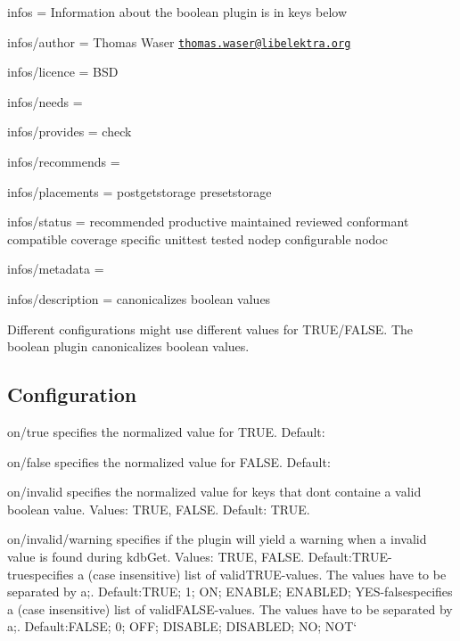 
\begin{DoxyItemize}
\item infos = Information about the boolean plugin is in keys below
\item infos/author = Thomas Waser \href{mailto:thomas.waser@libelektra.org}{\tt thomas.\+waser@libelektra.\+org}
\item infos/licence = B\+SD
\item infos/needs =
\item infos/provides = check
\item infos/recommends =
\item infos/placements = postgetstorage presetstorage
\item infos/status = recommended productive maintained reviewed conformant compatible coverage specific unittest tested nodep configurable nodoc
\item infos/metadata =
\item infos/description = canonicalizes boolean values
\end{DoxyItemize}

Different configurations might use different values for {\ttfamily T\+R\+UE}/{\ttfamily F\+A\+L\+SE}. The {\ttfamily boolean} plugin canonicalizes boolean values.

\subsection*{Configuration}


\begin{DoxyItemize}
\item {\ttfamily on/true} specifies the normalized value for {\ttfamily T\+R\+UE}. Default\+: {}
\item {\ttfamily on/false} specifies the normalized value for {\ttfamily F\+A\+L\+SE}. Default\+: {}
\item {\ttfamily on/invalid} specifies the normalized value for keys that don\textquotesingle{}t containe a valid boolean value. Values\+: {\ttfamily T\+R\+UE}, {\ttfamily F\+A\+L\+SE}. Default\+: {\ttfamily T\+R\+UE}.
\item {\ttfamily on/invalid/warning} specifies if the plugin will yield a warning when a invalid value is found during kdb\+Get. Values\+: {\ttfamily T\+R\+UE}, {\ttfamily F\+A\+L\+SE}. {\ttfamily Default\+:}T\+R\+UE{\ttfamily  -\/}true{\ttfamily specifies a (case insensitive) list of valid}T\+R\+UE{\ttfamily -\/values. The values have to be separated by a};{\ttfamily . Default\+:}T\+R\+UE; 1; ON; E\+N\+A\+B\+LE; E\+N\+A\+B\+L\+ED; Y\+ES{\ttfamily  -\/}false{\ttfamily specifies a (case insensitive) list of valid}F\+A\+L\+SE{\ttfamily -\/values. The values have to be separated by a};{\ttfamily . Default\+:}F\+A\+L\+SE; 0; O\+FF; D\+I\+S\+A\+B\+LE; D\+I\+S\+A\+B\+L\+ED; NO; N\+O\+T` 
\end{DoxyItemize}